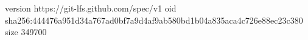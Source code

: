 version https://git-lfs.github.com/spec/v1
oid sha256:444476a951d34a767ad0bf7a9d4af9ab580bd1b04a835aca4c726e88ec23c380
size 349700
